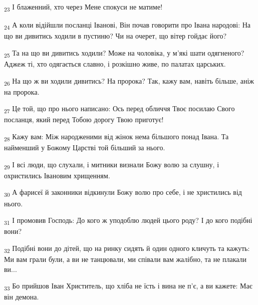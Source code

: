 \begin{tcolorbox}
\textsubscript{23} І блаженний, хто через Мене спокуси не матиме!
\end{tcolorbox}
\begin{tcolorbox}
\textsubscript{24} А коли відійшли посланці Іванові, Він почав говорити про Івана народові: На що ви дивитись ходили в пустиню? Чи на очерет, що вітер гойдає його?
\end{tcolorbox}
\begin{tcolorbox}
\textsubscript{25} Та на що ви дивитись ходили? Може на чоловіка, у м'які шати одягненого? Аджеж ті, хто одягається славно, і розкішно живе, по палатах царських.
\end{tcolorbox}
\begin{tcolorbox}
\textsubscript{26} На що ж ви ходили дивитись? На пророка? Так, кажу вам, навіть більше, аніж на пророка.
\end{tcolorbox}
\begin{tcolorbox}
\textsubscript{27} Це той, що про нього написано: Ось перед обличчя Твоє посилаю Свого посланця, який перед Тобою дорогу Твою приготує!
\end{tcolorbox}
\begin{tcolorbox}
\textsubscript{28} Кажу вам: Між народженими від жінок нема більшого понад Івана. Та найменший у Божому Царстві той більший за нього.
\end{tcolorbox}
\begin{tcolorbox}
\textsubscript{29} І всі люди, що слухали, і митники визнали Божу волю за слушну, і охристились Івановим хрищенням.
\end{tcolorbox}
\begin{tcolorbox}
\textsubscript{30} А фарисеї й законники відкинули Божу волю про себе, і не христились від нього.
\end{tcolorbox}
\begin{tcolorbox}
\textsubscript{31} І промовив Господь: До кого ж уподоблю людей цього роду? І до кого подібні вони?
\end{tcolorbox}
\begin{tcolorbox}
\textsubscript{32} Подібні вони до дітей, що на ринку сидять й один одного кличуть та кажуть: Ми вам грали були, а ви не танцювали, ми співали вам жалібно, та не плакали ви...
\end{tcolorbox}
\begin{tcolorbox}
\textsubscript{33} Бо прийшов Іван Христитель, що хліба не їсть і вина не п'є, а ви кажете: Має він демона.
\end{tcolorbox}

